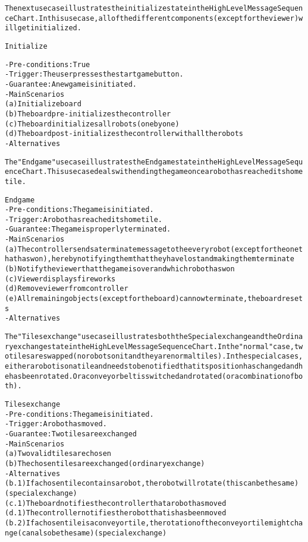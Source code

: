 \begin{alltt}
\rm
The next use case illustrates the initialize state in the High Level Message Sequence Chart. In this use case, all of the different components (except for the viewer) will get initialized. 

Initialize

- Pre-conditions: True
- Trigger: The user presses the start game button.
- Guarantee: A new game is initiated.
- Main Scenarios
    (a) Initialize board
    (b) The board pre-initializes the controller
    (c) The board initializes all robots (one by one)
    (d) The board post-initializes the controller with all the robots
- Alternatives

The "End game" use case illustrates the End game state in the High Level Message Sequence Chart. This use case deals with ending the game once a robot has reached its home tile.

End game
- Pre-conditions: The game is initiated.
- Trigger:  A robot has reached its home tile.
- Guarantee: The game is properly terminated.
- Main Scenarios
    (a) The controller sends a terminate message to the every robot (except for the one that has won), hereby notifying them that they have lost and making them terminate
    (b) Notify the viewer that the game is over and which robot has won
    (c) Viewer displays fireworks
    (d) Remove viewer from controller
    (e) All remaining objects (except for the board) can now terminate, the board resets
- Alternatives

The "Tiles exchange" use case illustrates both the Special exchange and the Ordinary exchange state in the High Level Message Sequence Chart. In the "normal" case, two tiles are swapped (no robots on it and they are normal tiles). In the special cases, either a robot is on a tile and needs to be notified that its position has changed and he has been rotated. Or a conveyor belt is switched and rotated (or a combination of both).

Tiles exchange
- Pre-conditions: The game is initiated.
- Trigger:  A robot has moved.
- Guarantee: Two tiles are exchanged
- Main Scenarios
    (a) Two valid tiles are chosen
    (b) The chosen tiles are exchanged (ordinary exchange)
- Alternatives
    (b.1) If a chosen tile contains a robot, the robot will rotate (this can be the same) (special exchange)
    (c.1) The board notifies the controller that a robot has moved
    (d.1) The controller notifies the robot that is has been moved
    (b.2) If a chosen tile is a conveyor tile, the rotation of the conveyor tile might change (can also be the same) (special exchange)
    

\end{alltt}
